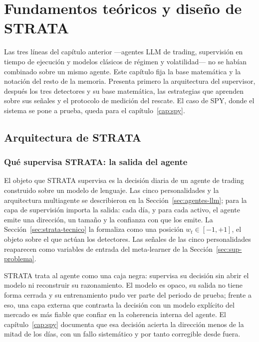 \chapter{Fundamentos teóricos y diseño de STRATA}
\label{cap:strata}

Las tres líneas del capítulo anterior —agentes LLM de trading, supervisión en tiempo de ejecución y modelos clásicos de régimen y volatilidad— no se habían combinado sobre un mismo agente. Este capítulo fija la base matemática y la notación del resto de la memoria. Presenta primero la arquitectura del supervisor, después los tres detectores y su base matemática, las estrategias que aprenden sobre sus señales y el protocolo de medición del rescate. El caso de SPY, donde el sistema se pone a prueba, queda para el capítulo~\ref{cap:spy}.

\section{Arquitectura de STRATA}
\label{sec:strata-arquitectura}

\subsection{Qué supervisa STRATA: la salida del agente}
\label{sec:agente-salida}

El objeto que STRATA supervisa es la decisión diaria de un agente de trading construido sobre un modelo de lenguaje. Las cinco personalidades y la arquitectura multiagente se describieron en la Sección~\ref{sec:agentes-llm}; para la capa de supervisión importa la salida: cada día, y para cada activo, el agente emite una dirección, un tamaño y la confianza con que los emite. La Sección~\ref{sec:strata-tecnico} la formaliza como una posición $w_t \in [-1, +1]$, el objeto sobre el que actúan los detectores. Las señales de las cinco personalidades reaparecen como variables de entrada del meta-learner de la Sección~\ref{sec:sup-problema}.

STRATA trata al agente como una caja negra: supervisa su decisión sin abrir el modelo ni reconstruir su razonamiento. El modelo es opaco, su salida no tiene forma cerrada y su entrenamiento pudo ver parte del periodo de prueba; frente a eso, una capa externa que contrasta la decisión con un modelo explícito del mercado es más fiable que confiar en la coherencia interna del agente. El capítulo~\ref{cap:spy} documenta que esa decisión acierta la dirección menos de la mitad de los días, con un fallo sistemático y por tanto corregible desde fuera.

